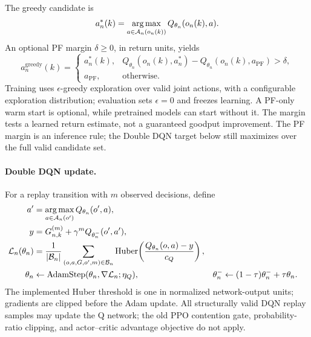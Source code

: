 \begin{EnChapter}
The greedy candidate is
\begin{equation}
  a_n^*(k)=\operatorname*{arg\,max}_{a\in\mathcal{A}_n(o_n(k))}Q_{\theta_n}(o_n(k),a).
\end{equation}
An optional PF margin $\delta\ge0$, in return units, yields
\begin{equation}
  a_n^{\mathrm{greedy}}(k)=
  \begin{cases}
    a_n^*(k),&Q_{\theta_n}(o_n(k),a_n^*)-Q_{\theta_n}(o_n(k),a_{\mathrm{PF}})>\delta,\\
    a_{\mathrm{PF}},&\text{otherwise}.
  \end{cases}
  \label{eq:pf-margin}
\end{equation}
Training uses $\epsilon$-greedy exploration over valid joint actions, with a
configurable exploration distribution; evaluation sets $\epsilon=0$ and freezes
learning. A PF-only warm start is optional, while pretrained models can start
without it. The margin tests a learned return estimate, not a guaranteed goodput
improvement. The PF margin is an inference rule; the Double DQN target below
still maximizes over the full valid candidate set.

\paragraph{Double DQN update.}
For a replay transition with $m$ observed decisions, define
\begin{align}
  a'&=\operatorname*{arg\,max}_{a\in\mathcal{A}_n(o')}Q_{\theta_n}(o',a),\\
  y&=G_{n,k}^{(m)}+\gamma^m Q_{\theta_n^-}(o',a'),
  \label{eq:ddqn-target}\\
  \mathcal{L}_n(\theta_n)&=\frac{1}{|\mathcal{B}_n|}
          \sum_{(o,a,G,o',m)\in\mathcal{B}_n}
          \operatorname{Huber}\!\left(\frac{Q_{\theta_n}(o,a)-y}{c_Q}\right),
  \label{eq:dqn-loss}\\
  \theta_n&\leftarrow\operatorname{AdamStep}(\theta_n,\nabla\mathcal{L}_n;\eta_Q), &
  \theta_n^-&\leftarrow(1-\tau)\theta_n^-+\tau\theta_n.
  \label{eq:polyak}
\end{align}
The implemented Huber threshold is one in normalized network-output units;
gradients are clipped before the Adam update. All structurally valid DQN replay
samples may update the Q network; the old PPO contention gate, probability-ratio
clipping, and actor--critic advantage objective do not apply.


\end{EnChapter}
